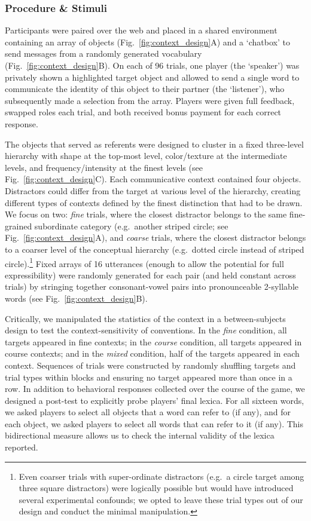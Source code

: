 \subsubsection{Procedure \& Stimuli}
Participants were paired over the web and placed in a shared environment containing an array of objects (Fig.\ \ref{fig:context_design}A) and a `chatbox' to send messages from a randomly generated vocabulary (Fig.\ \ref{fig:context_design}B). On each of 96 trials, one player (the `speaker') was privately shown a highlighted target object and allowed to send a single word to communicate the identity of this object to their partner (the `listener'), who subsequently made a selection from the array. Players were given full feedback, swapped roles each trial, and both received bonus payment for each correct response.

The objects that served as referents were designed to cluster in a fixed three-level hierarchy with shape at the top-most level, color/texture at the intermediate levels, and frequency/intensity at the finest levels (see Fig.\ \ref{fig:context_design}C). Each communicative context contained four objects. Distractors could differ from the target at various level of the hierarchy, creating different types of contexts defined by the finest distinction that had to be drawn. We focus on two: \emph{fine} trials, where the closest distractor belongs to the same fine-grained subordinate category (e.g.\ another striped circle; see Fig.\ \ref{fig:context_design}A), and \emph{coarse} trials, where the closest distractor belongs to a coarser level of the conceptual hierarchy (e.g.\ dotted circle instead of striped circle).\footnote{Even coarser trials with super-ordinate distractors (e.g.\ a circle target among three square distractors) were logically possible but would have introduced several experimental confounds; we opted to leave these trial types out of our design and conduct the minimal manipulation.} Fixed arrays of 16 utterances (enough to allow the potential for full expressibility) were randomly generated for each pair (and held constant across trials) by stringing together consonant-vowel pairs into pronounceable 2-syllable words (see Fig.\ \ref{fig:context_design}B).

Critically, we manipulated the statistics of the context in a between-subjects design to test the context-sensitivity of conventions. 
In the \emph{fine} condition, all targets appeared in fine contexts; in the \emph{course} condition, all targets appeared in course contexts; and in the \emph{mixed} condition, half of the targets appeared in each context.
Sequences of trials were constructed by randomly shuffling targets and trial types within blocks and ensuring no target appeared more than once in a row. 
In addition to behavioral responses collected over the course of the game, we designed a post-test to explicitly probe players' final lexica. For all sixteen words, we asked players to select all objects that a word can refer to (if any), and for each object, we asked players to select all words that can refer to it (if any). 
This bidirectional measure allows us to check the internal validity of the lexica reported.

